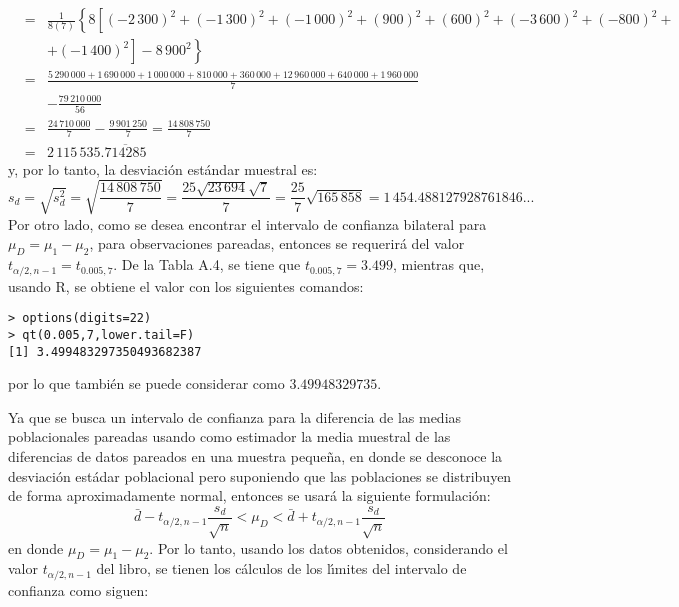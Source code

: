 \begin{solucion}
\begin{eqnarray*}
  & = & \frac{1}{8(7)} \left\{ 8\left[ (-2\,300)^2 + (-1\,300)^2 + (-1\,000)^2 + (900)^2 + (600)^2 + (-3\,600)^2 + (-800)^2 + \right. \right. \\
  & & \left. \left. + (-1\,400)^2 \right] - 8\,900^2 \right\} \\
  & = & \frac{5\,290\,000 + 1\,690\,000 + 1\,000\,000 + 810\,000 + 360\,000 + 12\,960\,000 + 640\,000 + 1\,960\,000}{7} \\
  & & - \frac{79\,210\,000}{56} \\
  & = & \frac{24\,710\,000}{7} - \frac{9\,901\,250}{7} = \frac{14\,808\,750}{7} \\
  & = & 2\,115\,535.\overline{714285}
 \end{eqnarray*}
 y, por lo tanto, la desviaci\'on est\'andar muestral es:
 \begin{equation*}
  s_d = \sqrt{s_d^2} = \sqrt{\frac{14\,808\,750}{7}} = \frac{25\sqrt{23\,694}\sqrt{7}}{7} = \frac{25}{7}\sqrt{165\,858} = 1\,454.488127928761846...
 \end{equation*}
 Por otro lado, como se desea encontrar el intervalo de confianza bilateral para $\mu_D = \mu_1 - \mu_2$, para observaciones pareadas, entonces se requerir\'a del valor $t_{\alpha/2, n-1} = t_{0.005,7}$. De la Tabla A.4, se tiene que $t_{0.005,7} = 3.499$, mientras que, usando R, se obtiene el valor con los siguientes comandos:
 \begin{verbatim}
> options(digits=22)
> qt(0.005,7,lower.tail=F)
[1] 3.499483297350493682387
 \end{verbatim}
 \vspace{-0.5cm}
 por lo que tambi\'en se puede considerar como $3.49948329735$. 
 \par 
 Ya que se busca un intervalo de confianza para la diferencia de las medias poblacionales pareadas usando como estimador la media muestral de las diferencias de datos pareados en una muestra peque\~na, en donde se desconoce la desviaci\'on est\'adar poblacional pero suponiendo que las poblaciones se distribuyen de forma aproximadamente normal, entonces se usar\'a la siguiente formulaci\'on:
 \begin{equation*}
  \bar{d} - t_{\alpha/2,n-1}\frac{s_d}{\sqrt{n}} < \mu_D < \bar{d} + t_{\alpha/2,n-1}\frac{s_d}{\sqrt{n}}
 \end{equation*}
 en donde $\mu_D = \mu_1 - \mu_2$. Por lo tanto, usando los datos obtenidos, considerando el valor $t_{\alpha/2,n-1}$ del libro, se tienen los c\'alculos de los l\'{\i}mites del intervalo de confianza como siguen:
 \begin{eqnarray*}

\end{eqnarray*}
\end{solucion}
